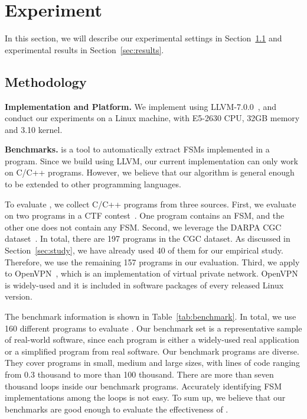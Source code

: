 \section{Experiment}
\label{sec:exp}


In this section, we will describe our experimental settings in Section~\ref{sec:meth} 
and experimental results in Section~\ref{sec:results}. 

\subsection{Methodology}
\label{sec:meth}

\noindent\textbf{Implementation and Platform.}
We implement \Tool{} using LLVM-7.0.0~\cite{LLVM},
and conduct our experiments on a Linux machine,
with E5-2630 CPU, 32GB memory and 3.10 kernel.

\noindent\textbf{Benchmarks.}
\Tool{} is a tool to automatically extract FSMs implemented in a program.
Since we build \Tool{} using LLVM,
our current implementation can only work on C/C++ programs.
However, we believe that our algorithm is general enough
to be extended to other programming languages.

To evaluate \Tool{}, we collect C/C++ programs from three sources.
First, we evaluate \Tool{} on two programs in a CTF contest~\cite{ctf}.
One program contains an FSM, and the other one does not contain any FSM.
Second, we leverage the DARPA CGC dataset~\cite{CGC}.
In total, there are 197 programs in the CGC dataset.
As discussed in Section~\ref{sec:study},
we have already used 40 of them for our empirical study.
Therefore, we use the remaining 157 programs in our evaluation.
Third, we apply \Tool{} to OpenVPN~\cite{openvpn},
which is an implementation of virtual private network. 
OpenVPN is widely-used and it
is included in software packages of every released Linux version.





The benchmark information is shown in Table~\ref{tab:benchmark}.
In total, we use 160 different programs to evaluate \Tool{}.
Our benchmark set is a representative sample of real-world software,
since each program is either a widely-used real application or a simplified program
from real software.
Our benchmark programs are diverse.
They cover programs in small, medium and large sizes,
with lines of code ranging from 0.3 thousand to more than 100 thousand.
There are more than seven thousand
loops inside our benchmark programs. Accurately
identifying FSM implementations among the loops is not easy.
To sum up, we believe that our benchmarks are good
enough to evaluate the effectiveness of \Tool{}.

